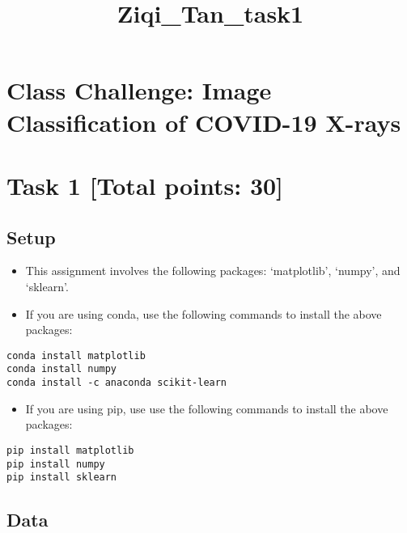 \documentclass[11pt]{article}
\title{Ziqi\_Tan\_task1}
\providecommand{\tightlist}{%
      \setlength{\itemsep}{0pt}\setlength{\parskip}{0pt}}
\begin{document}
    
    \maketitle
    
    

    
    \hypertarget{class-challenge-image-classification-of-covid-19-x-rays}{%
\section{Class Challenge: Image Classification of COVID-19
X-rays}\label{class-challenge-image-classification-of-covid-19-x-rays}}

\hypertarget{task-1-total-points-30}{%
\section{Task 1 {[}Total points: 30{]}}\label{task-1-total-points-30}}

    \hypertarget{setup}{%
\subsection{Setup}\label{setup}}

\begin{itemize}
\item
  This assignment involves the following packages: `matplotlib',
  `numpy', and `sklearn'.
\item
  If you are using conda, use the following commands to install the
  above packages:
\end{itemize}

\begin{verbatim}
conda install matplotlib
conda install numpy
conda install -c anaconda scikit-learn
\end{verbatim}

\begin{itemize}
\tightlist
\item
  If you are using pip, use use the following commands to install the
  above packages: 
\end{itemize}

\begin{verbatim}
pip install matplotlib
pip install numpy
pip install sklearn
\end{verbatim}

    \hypertarget{data}{%
\subsection{Data}\label{data}}
\end{document}
